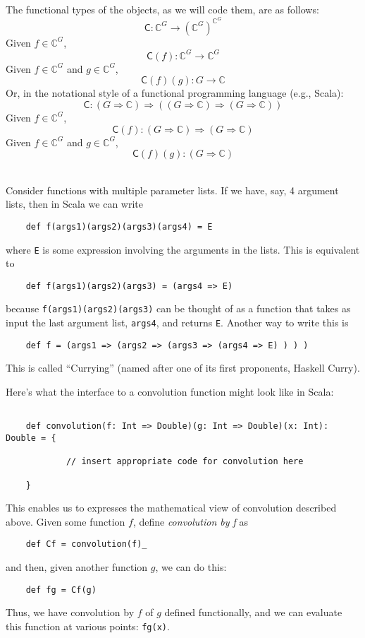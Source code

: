 \documentclass{article}
\newcommand\C{\ensuremath{\mathbb{C}}}
\newcommand{\lt}[1]{\ensuremath{\mathsf{#1}}}
\newcommand\conv{\lt{C}}
\begin{document}
The functional types of the objects, as we will code them, are as follows:
\[
\conv : \C^G \rightarrow (\C^G)^{\C^G}
\]
Given $f\in \C^G$,
\[
\conv(f) : \C^G \rightarrow \C^G
\]
Given $f\in \C^G$ and $g\in \C^G$,
\[
\conv(f)(g) : G \rightarrow \C
\]
Or, in the notational style of a functional programming language (e.g., Scala):
\[
\conv : (G \Rightarrow \C) \Rightarrow ( (G \Rightarrow \C) \Rightarrow (G \Rightarrow \C) )
\]
Given $f\in \C^G$,
\[
\conv(f) : (G \Rightarrow \C) \Rightarrow (G \Rightarrow \C)
\]
Given $f\in \C^G$ and $g\in \C^G$,
\[
\conv(f)(g) : (G \Rightarrow \C)
\]

\vskip5mm
\\[5pt]
Consider functions with multiple parameter lists. If we have, say, 4
argument lists, then in Scala we can write
{\small
\begin{verbatim}
    def f(args1)(args2)(args3)(args4) = E
\end{verbatim}}
\noindent where {\tt E} is some expression involving the arguments in the lists.
This is equivalent to
{\small
\begin{verbatim}
    def f(args1)(args2)(args3) = (args4 => E)
\end{verbatim}}
\noindent because {\tt f(args1)(args2)(args3)} can be thought of as a function that takes
as input the last argument list, {\tt args4}, and returns {\tt E}.
Another way to write this is
{\small
\begin{verbatim}
    def f = (args1 => (args2 => (args3 => (args4 => E) ) ) )
\end{verbatim}}
\noindent This is called ``Currying'' (named after one of its first proponents, Haskell Curry).
  
Here's what the interface to a convolution function might look like in Scala:
{\small
\begin{verbatim}
  
    def convolution(f: Int => Double)(g: Int => Double)(x: Int): Double = {

            // insert appropriate code for convolution here

    }
\end{verbatim}}
\noindent This enables us to expresses the mathematical view of convolution
described above.  Given some
function $f$, define \emph{convolution by f} as
{\small
\begin{verbatim}
    def Cf = convolution(f)_
\end{verbatim}}
\noindent and then, given another function $g$, we can do this:
{\small
\begin{verbatim}
    def fg = Cf(g)
\end{verbatim}
}  
\noindent Thus, we have convolution by $f$ of $g$ defined functionally, and we can 
evaluate this function at various points: {\tt fg(x)}.
\end{document}
